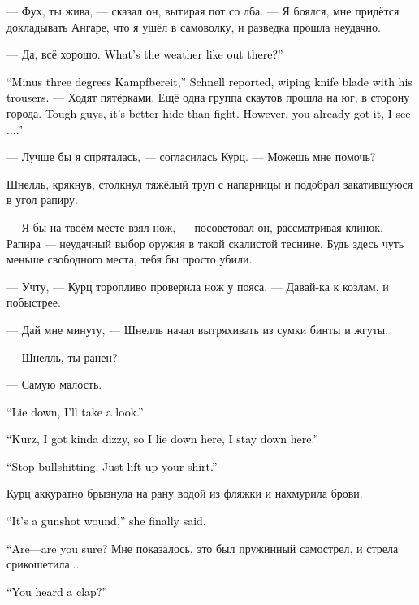 \documentclass[a4paper,10pt,fleqn]{book}\usepackage{polyglossia}\setdefaultlanguage{english}\setotherlanguage{russian}\defaultfontfeatures{Ligatures=TeX,Mapping=tex-text}\usepackage{xcolor}\definecolor{lightgray}{HTML}{bbbbbb}\color{lightgray}\newcommand{\ml}[3]{\textcolor{black}{#3}}
\begin{document}
--- Фух, ты жива, --- сказал он, вытирая пот со лба.
--- Я боялся, мне придётся докладывать Ангаре, что я ушёл в самоволку, и разведка прошла неудачно.

--- Да, всё хорошо.
\ml{$0$}
{Как у тебя погода?}
{What's the weather like out there?''}

\ml{$0$}
{--- На улице минус три, --- отрапортовал Шнелль, вытирая лезвие ножа о штаны.}
{``Minus three degrees Kampfbereit,'' Schnell reported, wiping knife blade with his trousers.}
--- Ходят пятёрками.
Ещё одна группа скаутов прошла на юг, в сторону города.
\ml{$0$}
{Ребята очень жёсткие, лучше спрятаться, чем драться.}
{Tough guys, it's better hide than fight.}
\ml{$0$}
{Впрочем, ты и сама поняла, как я вижу...}
{However, you already got it, I see ....''}

--- Лучше бы я спряталась, --- согласилась Курц.
--- Можешь мне помочь?

Шнелль, крякнув, столкнул тяжёлый труп с напарницы и подобрал закатившуюся в угол рапиру.

--- Я бы на твоём месте взял нож, --- посоветовал он, рассматривая клинок.
--- Рапира --- неудачный выбор оружия в такой скалистой теснине.
Будь здесь чуть меньше свободного места, тебя бы просто убили.

--- Учту, --- Курц торопливо проверила нож у пояса.
--- Давай-ка к козлам, и побыстрее.

--- Дай мне минуту, --- Шнелль начал вытряхивать из сумки бинты и жгуты.

--- Шнелль, ты ранен?

--- Самую малость.

\ml{$0$}
{--- Ложись, я осмотрю.}
{``Lie down, I'll take a look.''}

\ml{$0$}
{--- Курц, меня немного крутит, так что если я лягу --- я уже не встану.}
{``Kurz, I got kinda dizzy, so I lie down here, I stay down here.''}

\ml{$0$}
{--- Хватит нести чушь.}
{``Stop bullshitting.}
\ml{$0$}
{Просто подними рубаху.}
{Just lift up your shirt.''}

Курц аккуратно брызнула на рану водой из фляжки и нахмурила брови.

\ml{$0$}
{--- Это огнестрел, --- наконец выдала она.}
{``It's a gunshot wound,'' she finally said.}

\ml{$0$}
{--- Т-ты уверена?}
{``Are---are you sure?}
Мне показалось, это был пружинный самострел, и стрела срикошетила...

\ml{$0$}
{--- Он хлопнул?}
{``You heard a clap?''}
\end{document}
